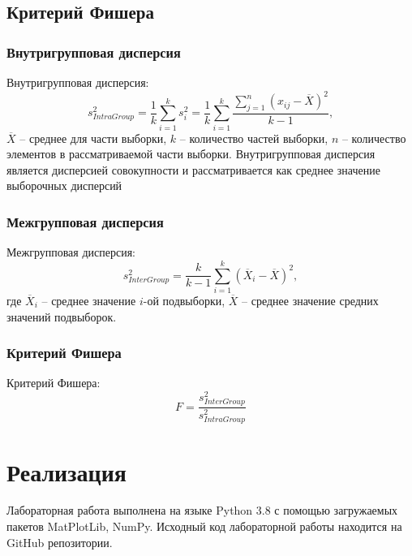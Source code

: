 \documentclass[12pt,a4paper]{article}
\begin{document}
		\subsection{Критерий Фишера}
			\subsubsection{Внутригрупповая дисперсия}
			Внутригрупповая дисперсия:
			\begin{equation}
				s_{IntraGroup}^2=\frac{1}{k}\sum_{i=1}^{k}s_i^2 = 	\frac{1}{k}\sum_{i=1}^{k}\frac{\sum_{j=1}^{n}(x_{ij}-\overline{X})^2}{k-1},
			\end{equation}
			$\overline{X}$ – среднее для части выборки, $k$ – количество частей выборки,
			$n$ – количество элементов в рассматриваемой части выборки.
			Внутригрупповая дисперсия является дисперсией совокупности и
			рассматривается как среднее значение выборочных дисперсий
			
			\subsubsection{Межгрупповая дисперсия}
			Межгрупповая дисперсия:
			\begin{equation}
				s_{InterGroup}^2 = \frac{k}{k-1}\sum_{i=1}^{k}(\overline{X}_i-\overline{X})^2,
			\end{equation}
			где $\overline{X}_i$ – среднее значение $i$-ой подвыборки, $\overline{X}$ –
			среднее значение средних значений подвыборок.
			
			\subsubsection{Критерий Фишера}
			Критерий Фишера:
			\begin{equation}
				F = \frac{s_{InterGroup}^2}{s_{IntraGroup}^2}
			\end{equation}
	\newpage
	
	\section{Реализация}
	Лабораторная работа выполнена на языке Python 3.8 с помощью загружаемых пакетов MatPlotLib, NumPy. Исходный код лабораторной работы находится на GitHub репозитории.
	\newpage
	
\end{document}
